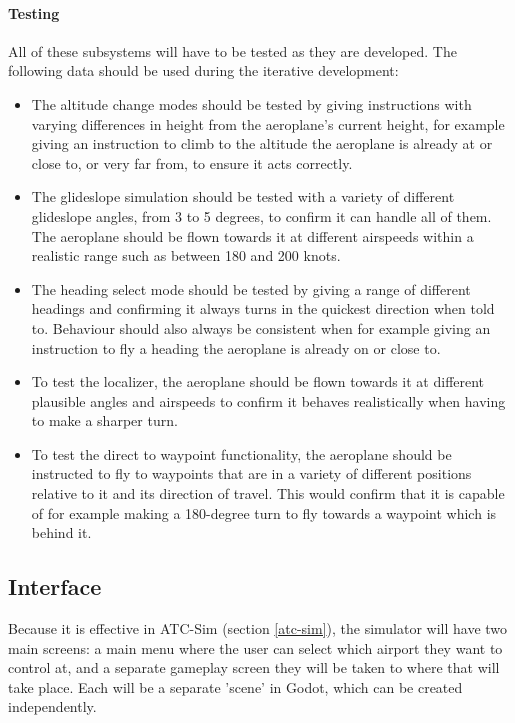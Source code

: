 \documentclass{article}
\begin{document}
\paragraph{Testing}
All of these subsystems will have to be tested as they are developed.
The following data should be used during the iterative development:
\begin{itemize}
    \item The altitude change modes should be tested by giving instructions with varying differences in height from the aeroplane's current height, for example giving an instruction to climb to the altitude the aeroplane is already at or close to, or very far from, to ensure it acts correctly.
    \item The glideslope simulation should be tested with a variety of different glideslope angles, from 3 to 5 degrees, to confirm it can handle all of them.
    The aeroplane should be flown towards it at different airspeeds within a realistic range such as between 180 and 200 knots.
    \item The heading select mode should be tested by giving a range of different headings and confirming it always turns in the quickest direction when told to.
    Behaviour should also always be consistent when for example giving an instruction to fly a heading the aeroplane is already on or close to.
    \item To test the localizer, the aeroplane should be flown towards it at different plausible angles and airspeeds to confirm it behaves realistically when having to make a sharper turn.
    \item To test the direct to waypoint functionality, the aeroplane should be instructed to fly to waypoints that are in a variety of different positions relative to it and its direction of travel.
    This would confirm that it is capable of for example making a 180-degree turn to fly towards a waypoint which is behind it.
\end{itemize}


\subsection{Interface}
Because it is effective in ATC-Sim (section \ref{atc-sim}), the simulator will have two main screens: a main menu where the user can select which airport they want to control at, and a separate gameplay screen they will be taken to where that will take place.
Each will be a separate 'scene' in Godot, which can be created independently.
\end{document}
